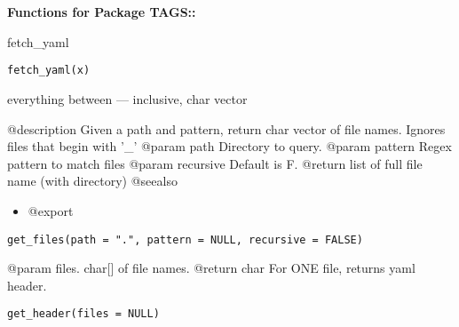 \documentclass[a4paper]{book}
\begin{document}
\chapter*{}
\begin{center}
{\textbf{\huge Functions for Package TAGS::}}
\par\bigskip{\large \today}
\end{center}
%
\begin{Description}\relax
fetch\_yaml
\end{Description}
%
\begin{Usage}
\begin{verbatim}
fetch_yaml(x)
\end{verbatim}
\end{Usage}
%
\begin{Value}
everything between --- inclusive, char vector
\end{Value}
%
\begin{Description}\relax
@description  Given a path and pattern, return char vector of file names.
Ignores files that begin with '\_'
@param path  Directory to query.
@param pattern Regex pattern to match files
@param recursive Default is F.
@return list of full file name (with directory)
@seealso
\begin{itemize}

\item{} 
@export

\end{itemize}

\end{Description}
%
\begin{Usage}
\begin{verbatim}
get_files(path = ".", pattern = NULL, recursive = FALSE)
\end{verbatim}
\end{Usage}
%
\begin{Description}\relax
@param files. char[] of file names.
@return char For ONE file, returns yaml header.
\end{Description}
%
\begin{Usage}
\begin{verbatim}
get_header(files = NULL)
\end{verbatim}
\end{Usage}
\end{document}
